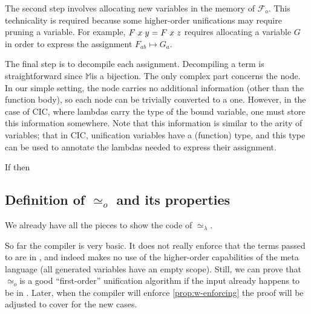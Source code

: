 \documentclass[sigconf,natbib=false,review]{acmart}
\newcommand{\appsep}{\ensuremath{\textcolor{lightgray}{\cdot}}}
\newcommand{\UnifRel}{\ensuremath{\simeq}}
\newcommand{\Uo}{\texorpdfstring{\ensuremath{\UnifRel_o}\xspace}{unif\_o}}
\newcommand{\Ue}{\ensuremath{\UnifRel_\lambda}\xspace}
\newcommand{\Fo}{\texorpdfstring{\ensuremath{\mathcal{F}_{\!o}\xspace}}{Fo}} %
\newcommand{\mapStore}{\texorpdfstring{\ensuremath{\mathbb{M}}\xspace}{M}}
\begin{document}
The second step involves allocating new variables in the
memory of \Fo{}. This technicality is required because some
higher-order unifications may require pruning a variable. For example,
$F\appsep x\appsep y = F\appsep x\appsep z$ requires allocating a 
variable $G$ in order to express the assignment $F_{ab} \mapsto G_a$.

The final step is to decompile each assignment.
Decompiling a term is straightforward since \mapStore is a bijection.
The only complex part concerns the  node. In our simple setting,
the  node carries no additional information (other than the function body),
so each  node can be trivially converted to a  one.
However, in the case of CIC, where lambdas carry the type of the bound variable, one
must store this information somewhere. Note that this information is similar
to the arity of variables; that in CIC, unification variables have a
(function) type, and this type can be used to annotate the lambdas
needed to express their assignment.

\begin{lemma}\label{prop:comprt} If
   then 
\end{lemma}

\subsection{Definition of \Uo{} and its properties}\label{sec:founif}

We already have all the pieces to show the code of \Ue{}.



\noindent
So far the compiler is very basic. It does not really
enforce that the terms passed to \hstep are in \wellb,
and indeed makes no use of the higher-order capabilities
of the meta language (all generated
variables have an empty scope).
Still, we can prove that \Uo is a good
``first-order'' unification algorithm if the input
already happens to be in \wellb.
Later, when the compiler will enforce \cref{prop:w-enforcing}
the proof will be adjusted to cover for the new cases.
\end{document}
